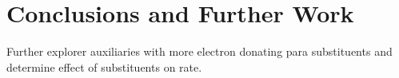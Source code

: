 \def\baselinestretch{1}
\chapter{Conclusions and Further Work}
\ifpdf
    \graphicspath{{Conclusions/ConclusionsFigs/PNG/}{Conclusions/ConclusionsFigs/PDF/}{Conclusions/ConclusionsFigs/}}
\else
    \graphicspath{{Conclusions/ConclusionsFigs/EPS/}{Conclusions/ConclusionsFigs/}}
\fi

\def\baselinestretch{1.66}

Further explorer auxiliaries with more electron donating para substituents and determine effect of substituents on rate.



